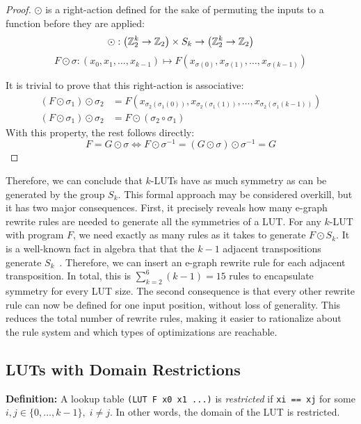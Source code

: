 \begin{proof}
    $\odot$ is a right-action defined for the sake of permuting the inputs to a function before they are applied:
    \[ \odot : \big (\mathbb{Z}_{2}^{k} \rightarrow \mathbb{Z}_2 \big ) \times S_k \rightarrow \big (\mathbb{Z}_{2}^{k} \rightarrow \mathbb{Z}_2 \big )\]
    \[ F \odot \sigma : (x_0, x_1, \ldots, x_{k-1}) \mapsto F(x_{\sigma(0)}, x_{\sigma(1)}, \ldots, x_{\sigma(k-1)}) \]

    It is trivial to prove that this right-action is associative:
    \begin{align*}
        (F \odot \sigma_1) \odot \sigma_2 & = F(x_{\sigma_2(\sigma_1(0))}, x_{\sigma_2(\sigma_1(1))}, \ldots, x_{\sigma_2(\sigma_1(k-1))}) \\
        (F \odot \sigma_1) \odot \sigma_2 & = F \odot (\sigma_2 \circ \sigma_1)
    \end{align*}
    With this property, the rest follows directly:
    \[ F = G \odot
        \sigma \iff F \odot \sigma^{-1} = (G \odot \sigma) \odot \sigma^{-1} = G \]
\end{proof}

Therefore, we can conclude that $k$-LUTs have as much symmetry as can be
generated by the group $S_k$. This formal approach may be considered overkill,
but it has two major consequences. First, it precisely reveals how many e-graph
rewrite rules are needed to generate all the symmetries of a LUT. For any
$k$-LUT with program $F$, we need exactly as many rules as it takes to generate
$F \odot S_k$. It is a well-known fact in algebra that that the $k-1$ adjacent
transpositions generate $S_k$~\cite{sgroup}. Therefore, we can insert an
e-graph rewrite rule for each adjacent transposition. In total, this is
$\sum_{k=2}^{6} (k-1) = 15$ rules to encapsulate symmetry for every LUT size.
The second consequence is that every other rewrite rule can now be defined for
one input position, without loss of generality. This reduces the total number
of rewrite rules, making it easier to rationalize about the rule system and
which types of optimizations are reachable.

\subsection{LUTs with Domain Restrictions}\label{sec:rewrites:restrict}

\textbf{Definition:} A lookup table \texttt{(LUT F x0 x1 ...)} is \textit{restricted} if \texttt{xi == xj} for some $ i, j \in \{0, \ldots, k-1\}, \; i \neq j$.
In other words, the domain of the LUT is restricted.

